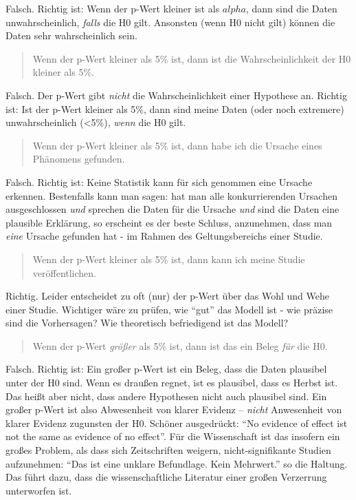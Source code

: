 \documentclass[12pt,ngerman,]{book}
\theoremstyle{definition}
\theoremstyle{definition}
\theoremstyle{remark}
\begin{document}
Falsch. Richtig ist: Wenn der p-Wert kleiner ist als \(alpha\), dann
sind die Daten unwahrscheinlich, \emph{falls} die H0 gilt. Ansonsten
(wenn H0 nicht gilt) können die Daten sehr wahrscheinlich sein.

\begin{quote}
Wenn der p-Wert kleiner als 5\% ist, dann ist die Wahrscheinlichkeit der
H0 kleiner als 5\%.
\end{quote}

Falsch. Der p-Wert gibt \emph{nicht} die Wahrscheinlichkeit einer
Hypothese an. Richtig ist: Ist der p-Wert kleiner als 5\%, dann sind
meine Daten (oder noch extremere) unwahrscheinlich (\textless{}5\%),
\emph{wenn} die H0 gilt.

\begin{quote}
Wenn der p-Wert kleiner als 5\% ist, dann habe ich die Ursache eines
Phänomens gefunden.
\end{quote}

Falsch. Richtig ist: Keine Statistik kann für sich genommen eine Ursache
erkennen. Bestenfalls kann man sagen: hat man alle konkurrierenden
Ursachen ausgeschlossen \emph{und} sprechen die Daten für die Ursache
\emph{und} sind die Daten eine plausible Erklärung, so erscheint es der
beste Schluss, anzunehmen, dass man \emph{eine} Ursache gefunden hat -
im Rahmen des Geltungsbereichs einer Studie.

\begin{quote}
Wenn der p-Wert kleiner als 5\% ist, dann kann ich meine Studie
veröffentlichen.
\end{quote}

Richtig. Leider entscheidet zu oft (nur) der p-Wert über das Wohl und
Wehe einer Studie. Wichtiger wäre zu prüfen, wie ``gut'' das Modell ist
- wie präzise sind die Vorhersagen? Wie theoretisch befriedigend ist das
Modell?

\begin{quote}
Wenn der p-Wert \emph{größer} als 5\% ist, dann ist das ein Beleg
\emph{für} die H0.
\end{quote}

Falsch. Richtig ist: Ein großer p-Wert ist ein Beleg, dass die Daten
plausibel unter der H0 sind. Wenn es draußen regnet, ist es plausibel,
dass es Herbst ist. Das heißt aber nicht, dass andere Hypothesen nicht
auch plausibel sind. Ein großer p-Wert ist also Abwesenheit von klarer
Evidenz -- \emph{nicht} Anwesenheit von klarer Evidenz zugunsten der H0.
Schöner ausgedrückt: ``No evidence of effect ist not the same as
evidence of no effect''. Für die Wissenschaft ist das insofern ein
großes Problem, als dass sich Zeitschriften weigern, nicht-signifikante
Studien aufzunehmen: ``Das ist eine unklare Befundlage. Kein Mehrwert.''
so die Haltung. Das führt dazu, dass die wissenschaftliche Literatur
einer großen Verzerrung unterworfen ist.
\end{document}
